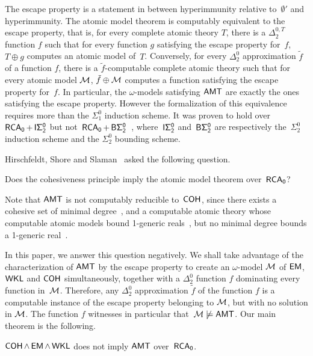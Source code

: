 The escape property is a statement in between hyperimmunity relative to~$\emptyset'$ and hyperimmunity.
The atomic model theorem is computably equivalent to the escape property, that is, for every complete atomic theory $T$,
there is a $\Delta^{0,T}_2$ function $f$ such that for every function $g$ satisfying the escape property for~$f$,
$T \oplus g$ computes an atomic model of~$T$. Conversely, for every $\Delta^0_2$ approximation $\tilde{f}$
of a function $f$, there is a $\tilde{f}$-computable complete atomic theory such that for every atomic model $\mathcal{M}$,
$\tilde{f} \oplus \mathcal{M}$ computes a function satisfying the escape property for~$f$.
In particular, the $\omega$-models satisfying $\operatorname{\sf{AMT}}$
are exactly the ones satisfying the escape property. However the formalization of this equivalence requires
more than the $\Sigma^0_1$ induction scheme.
It was proven to hold over~$\operatorname{\sf{RCA}_0} + \operatorname{\sf{I}\Sigma^0_2}$ but not~$\operatorname{\sf{RCA}_0} + \operatorname{\sf{B}\Sigma^0_2}$~\cite{Hirschfeldt2009atomic,Conidis2008Classifying}, 
where~$\operatorname{\sf{I}\Sigma^0_2}$ and~$\operatorname{\sf{B}\Sigma^0_2}$ are respectively the~$\Sigma^0_2$ induction scheme and
the $\Sigma^0_2$ bounding scheme.

Hirschfeldt, Shore and Slaman~\cite{Hirschfeldt2009atomic} asked the following question.

\begin{question}
Does the cohesiveness principle imply the atomic model theorem over~$\operatorname{\sf{RCA}_0}$?
\end{question}

Note that $\operatorname{\sf{AMT}}$ is not computably reducible to~$\operatorname{\sf{COH}}$, since there exists a cohesive set of minimal degree~\cite{Cooper1973Minimal},
and a computable atomic theory whose computable atomic models bound 1-generic reals~\cite{Hirschfeldt2015Slicing}, 
but no minimal degree bounds a 1-generic real~\cite{Yu2006Lowness}.

In this paper, we answer this question negatively.
We shall take advantage of the characterization of $\operatorname{\sf{AMT}}$ by the escape property to create an $\omega$-model $\mathcal{M}$ of $\operatorname{\sf{EM}}$, $\operatorname{\sf{WKL}}$
and $\operatorname{\sf{COH}}$ simultaneously, together with a $\Delta^0_2$ function $f$ dominating every function in~$\mathcal{M}$.
Therefore, any $\Delta^0_2$ approximation $\tilde{f}$ of the function $f$ 
is a computable instance of the escape property belonging to $\mathcal{M}$, but with no solution in $\mathcal{M}$.
The function $f$ witnesses in particular that~$\mathcal{M} \not \models \operatorname{\sf{AMT}}$.
Our main theorem is the following.

\begin{theorem}\label{thm:main-theorem}
$\operatorname{\sf{COH}} \wedge \operatorname{\sf{EM}} \wedge \operatorname{\sf{WKL}}$ does not imply $\operatorname{\sf{AMT}}$ over~$\operatorname{\sf{RCA}_0}$.
\end{theorem}

